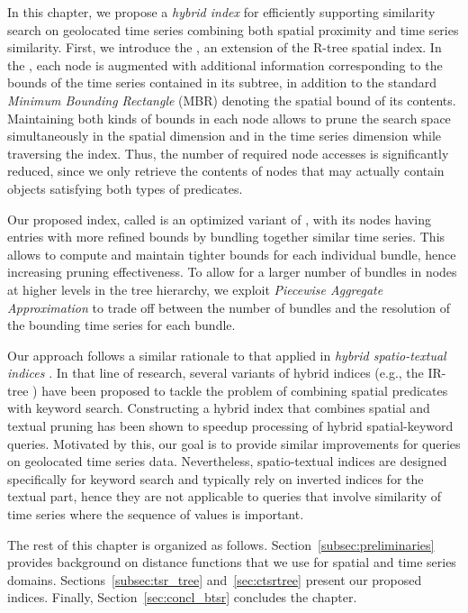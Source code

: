 
\graphicspath{{Papers/SIGSpatial2017/}{Papers/SIGSpatial2018/}}

In this chapter, we propose a {\em hybrid index} for efficiently supporting similarity search on geolocated time series combining both spatial proximity and time series similarity. First, we introduce the \textit{\tsr}, an extension of the R-tree spatial index. In the \tsr, each node is augmented with additional information corresponding to the bounds of the time series contained in its subtree, in addition to the standard \emph{Minimum Bounding Rectangle} (MBR) denoting the spatial bound of its contents. Maintaining both kinds of bounds in each node allows to prune the search space simultaneously in the spatial dimension and in the time series dimension while traversing the index. Thus, the number of required node accesses is significantly reduced, since we only retrieve the contents of nodes that may actually contain objects satisfying both types of predicates.

Our proposed index, called \textit{\btsr} is an optimized variant of \textit{\tsr}, with its nodes having entries with more refined bounds by bundling together similar time series. This allows to compute and maintain tighter bounds for each individual bundle, hence increasing pruning effectiveness. To allow for a larger number of bundles in nodes at higher levels in the tree hierarchy, we exploit \emph{Piecewise Aggregate Approximation} \cite{keogh2001paa,faloutsos2000vldb} to trade off between the number of bundles and the resolution of the bounding time series for each bundle.

Our approach follows a similar rationale to that applied in {\em hybrid spatio-textual indices} \cite{chen2013vldb}. In that line of research, several variants of hybrid indices (e.g., the IR-tree \cite{cong2009vldb}) have been proposed to tackle the problem of combining spatial predicates with keyword search. Constructing a hybrid index that combines spatial and textual pruning has been shown to speedup processing of hybrid spatial-keyword queries. Motivated by this, our goal is to provide similar improvements for queries on geolocated time series data. Nevertheless, spatio-textual indices are designed specifically for keyword search and typically rely on inverted indices for the textual part, hence they are not applicable to queries that involve similarity of time series where the sequence of values is important.

The rest of this chapter is organized as follows. Section~\ref{subsec:preliminaries} provides background on distance functions that we use for spatial and time series domains. Sections~\ref{subsec:tsr_tree} and~\ref{sec:ctsrtree} present our proposed indices. Finally, Section~\ref{sec:concl_btsr} concludes the chapter.